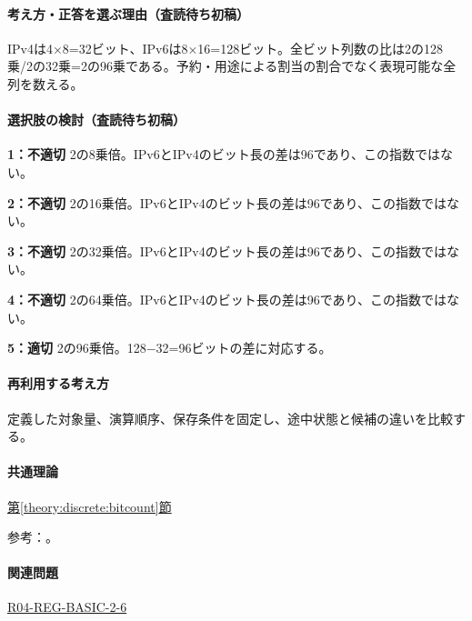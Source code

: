 \paragraph{考え方・正答を選ぶ理由（査読待ち初稿）} IPv4は4×8=\allowbreak{}32ビット、IPv6は8×16=\allowbreak{}128ビット。全ビット列数の比は2の128乗/2の32乗=2の96乗である。予約・用途による割当の割合でなく表現可能な全列を数える。

\paragraph{選択肢の検討（査読待ち初稿）}\mbox{}\par

\noindent\textbf{1：不適切} 2の8乗倍。IPv6とIPv4のビット長の差は96であり、この指数ではない。\par

\noindent\textbf{2：不適切} 2の16乗倍。IPv6とIPv4のビット長の差は96であり、この指数ではない。\par

\noindent\textbf{3：不適切} 2の32乗倍。IPv6とIPv4のビット長の差は96であり、この指数ではない。\par

\noindent\textbf{4：不適切} 2の64乗倍。IPv6とIPv4のビット長の差は96であり、この指数ではない。\par

\noindent\textbf{5：適切} 2の96乗倍。128−32=\allowbreak{}96ビットの差に対応する。\par

\paragraph{再利用する考え方} 定義した対象量、演算順序、保存条件を固定し、途中状態と候補の違いを比較する。

\paragraph{共通理論} \hyperref[theory:discrete:bitcount]{第\ref*{theory:discrete:bitcount}節}

\par 参考：\cite{rfc4291_addresses}。

\paragraph{関連問題} \hyperref[q:r04-reg-basic-2-6]{R04-REG-BASIC-2-6}


